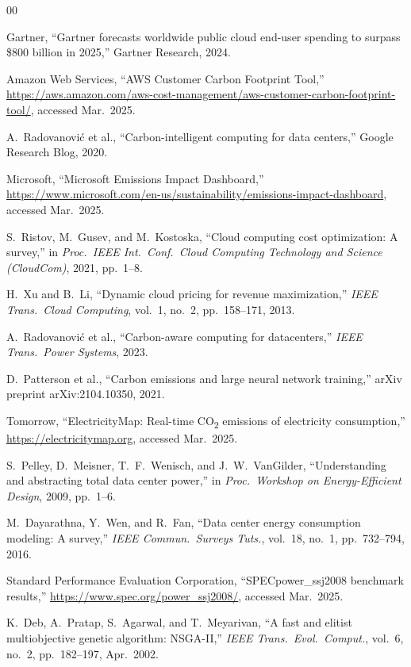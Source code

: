 \documentclass[conference]{IEEEtran}
\begin{document}
\begin{thebibliography}{00}

 Gartner, ``Gartner forecasts worldwide public cloud end-user spending to surpass \$800 billion in 2025,'' Gartner Research, 2024.

 Amazon Web Services, ``AWS Customer Carbon Footprint Tool,'' \url{https://aws.amazon.com/aws-cost-management/aws-customer-carbon-footprint-tool/}, accessed Mar.\ 2025.

 A.~Radovanovi\'{c} et al., ``Carbon-intelligent computing for data centers,'' Google Research Blog, 2020.

 Microsoft, ``Microsoft Emissions Impact Dashboard,'' \url{https://www.microsoft.com/en-us/sustainability/emissions-impact-dashboard}, accessed Mar.\ 2025.

 S.~Ristov, M.~Gusev, and M.~Kostoska, ``Cloud computing cost optimization: A survey,'' in \textit{Proc.\ IEEE Int.\ Conf.\ Cloud Computing Technology and Science (CloudCom)}, 2021, pp.\ 1--8.

 H.~Xu and B.~Li, ``Dynamic cloud pricing for revenue maximization,'' \textit{IEEE Trans.\ Cloud Computing}, vol.\ 1, no.\ 2, pp.\ 158--171, 2013.

 A.~Radovanovi\'{c} et al., ``Carbon-aware computing for datacenters,'' \textit{IEEE Trans.\ Power Systems}, 2023.

 D.~Patterson et al., ``Carbon emissions and large neural network training,'' arXiv preprint arXiv:2104.10350, 2021.

 Tomorrow, ``ElectricityMap: Real-time CO\textsubscript{2} emissions of electricity consumption,'' \url{https://electricitymap.org}, accessed Mar.\ 2025.

 S.~Pelley, D.~Meisner, T.~F.~Wenisch, and J.~W.~VanGilder, ``Understanding and abstracting total data center power,'' in \textit{Proc.\ Workshop on Energy-Efficient Design}, 2009, pp.\ 1--6.

 M.~Dayarathna, Y.~Wen, and R.~Fan, ``Data center energy consumption modeling: A survey,'' \textit{IEEE Commun.\ Surveys Tuts.}, vol.\ 18, no.\ 1, pp.\ 732--794, 2016.

 Standard Performance Evaluation Corporation, ``SPECpower\_ssj2008 benchmark results,'' \url{https://www.spec.org/power_ssj2008/}, accessed Mar.\ 2025.

 K.~Deb, A.~Pratap, S.~Agarwal, and T.~Meyarivan, ``A fast and elitist multiobjective genetic algorithm: NSGA-II,'' \textit{IEEE Trans.\ Evol.\ Comput.}, vol.\ 6, no.\ 2, pp.\ 182--197, Apr.\ 2002.


\end{thebibliography}
\end{document}
